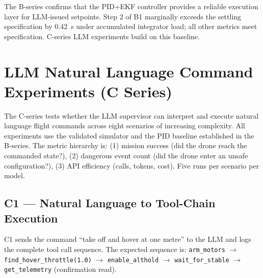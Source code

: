 The B-series confirms that the PID+EKF controller provides a reliable execution
layer for LLM-issued setpoints. Step 2 of B1 marginally exceeds the settling
specification by 0.42~s under accumulated integrator load; all other metrics
meet specification. C-series LLM experiments build on this baseline.


\section{LLM Natural Language Command Experiments (C Series)}
\label{sec:ch3_cseries}

The C-series tests whether the LLM supervisor can interpret and execute
natural language flight commands across eight scenarios of increasing
complexity. All experiments use the validated simulator and the PID baseline
established in the B-series. The metric hierarchy is: (1) mission success
(did the drone reach the commanded state?), (2) dangerous event count
(did the drone enter an unsafe configuration?), (3) API efficiency (calls,
tokens, cost). Five runs per scenario per model.

\subsection{C1 --- Natural Language to Tool-Chain Execution}
\label{sec:ch3_c1}

C1 sends the command ``take off and hover at one metre'' to the LLM and logs
the complete tool call sequence. The expected sequence is:
\texttt{arm\_motors} $\to$ \texttt{find\_hover\_throttle(1.0)} $\to$
\texttt{enable\_althold} $\to$ \texttt{wait\_for\_stable} $\to$
\texttt{get\_telemetry} (confirmation read).


